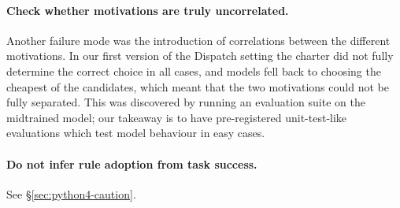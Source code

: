 \paragraph{Check whether motivations are truly uncorrelated.} Another failure mode was the introduction of correlations between the different motivations. In our first version of the Dispatch setting the charter did not fully determine the correct choice in all cases, and models fell back to choosing the cheapest of the candidates, which meant that the two motivations could not be fully separated. This was discovered by running an evaluation suite on the midtrained model; our takeaway is to have pre-registered unit-test-like evaluations which test model behaviour in easy cases.

\paragraph{Do not infer rule adoption from task success.} See \S\ref{sec:python4-caution}.